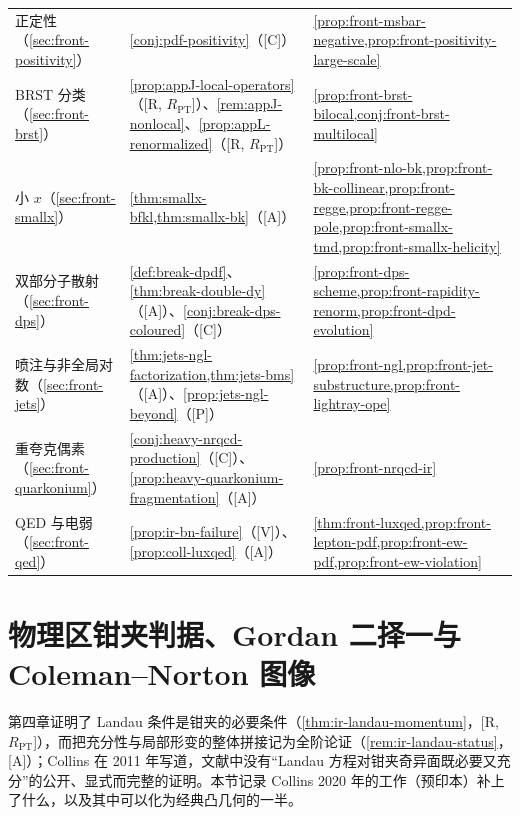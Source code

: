 \begin{table}[htbp]
\begin{tabularx}{\textwidth}{@{}p{2.4cm}>{\raggedright\arraybackslash}X>{\raggedright\arraybackslash}X@{}}
正定性（\cref{sec:front-positivity}） & \cref{conj:pdf-positivity}（[C]） & \cref{prop:front-msbar-negative,prop:front-positivity-large-scale} \\
BRST 分类（\cref{sec:front-brst}） & \cref{prop:appJ-local-operators}（[R, $R_{\mathrm{PT}}$]）、\cref{rem:appJ-nonlocal}、\cref{prop:appL-renormalized}（[R, $R_{\mathrm{PT}}$]） & \cref{prop:front-brst-bilocal,conj:front-brst-multilocal} \\
小 $x$（\cref{sec:front-smallx}） & \cref{thm:smallx-bfkl,thm:smallx-bk}（[A]） & \cref{prop:front-nlo-bk,prop:front-bk-collinear,prop:front-regge,prop:front-regge-pole,prop:front-smallx-tmd,prop:front-smallx-helicity} \\
双部分子散射（\cref{sec:front-dps}） & \cref{def:break-dpdf}、\cref{thm:break-double-dy}（[A]）、\cref{conj:break-dps-coloured}（[C]） & \cref{prop:front-dps-scheme,prop:front-rapidity-renorm,prop:front-dpd-evolution} \\
喷注与非全局对数（\cref{sec:front-jets}） & \cref{thm:jets-ngl-factorization,thm:jets-bms}（[A]）、\cref{prop:jets-ngl-beyond}（[P]） & \cref{prop:front-ngl,prop:front-jet-substructure,prop:front-lightray-ope} \\
重夸克偶素（\cref{sec:front-quarkonium}） & \cref{conj:heavy-nrqcd-production}（[C]）、\cref{prop:heavy-quarkonium-fragmentation}（[A]） & \cref{prop:front-nrqcd-ir} \\
QED 与电弱（\cref{sec:front-qed}） & \cref{prop:ir-bn-failure}（[V]）、\cref{prop:coll-luxqed}（[A]） & \cref{thm:front-luxqed,prop:front-lepton-pdf,prop:front-ew-pdf,prop:front-ew-violation} \\
\bottomrule
\end{tabularx}
\end{table}

\section{物理区钳夹判据、Gordan 二择一与 Coleman--Norton 图像}\label{sec:front-landau}

第四章证明了 Landau 条件是钳夹的必要条件（\cref{thm:ir-landau-momentum}，[R, $R_{\mathrm{PT}}$]），而把充分性与局部形变的整体拼接记为全阶论证（\cref{rem:ir-landau-status}，[A]）；Collins 在 2011 年写道，文献中没有“Landau 方程对钳夹奇异面既必要又充分”的公开、显式而完整的证明\cite[第~5.4.3~节，第~110~页]{Collins2011}。本节记录 Collins 2020 年的工作\cite{Collins:2020euz}（预印本）补上了什么，以及其中可以化为经典凸几何的一半。

